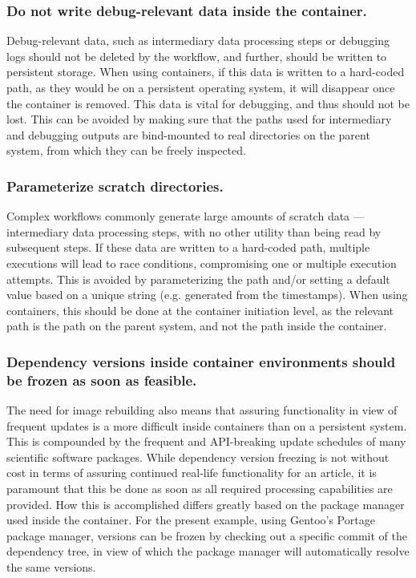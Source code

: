 \subsubsection{Do not write debug-relevant data inside the container.}
Debug-relevant data, such as intermediary data processing steps or debugging logs should not be deleted by the workflow, and further, should be written to persistent storage.
When using containers, if this data is written to a hard-coded path, as they would be on a persistent operating system, it will disappear once the container is removed.
This data is vital for debugging, and thus should not be lost.
This can be avoided by making sure that the paths used for intermediary and debugging outputs are bind-mounted to real directories on the parent system, from which they can be freely inspected.

\subsubsection{Parameterize scratch directories.}
Complex workflows commonly generate large amounts of scratch data — intermediary data processing steps, with no other utility than being read by subsequent steps.
If these data are written to a hard-coded path, multiple executions will lead to race conditions, compromising one or multiple execution attempts.
This is avoided by parameterizing the path and/or setting a default value based on a unique string (e.g. generated from the timestamps).
When using containers, this should be done at the container initiation level, as the relevant path is the path on the parent system, and not the path inside the container.

\subsubsection{Dependency versions inside container environments should be frozen as soon as feasible.}
The need for image rebuilding also means that assuring functionality in view of frequent updates is a more difficult inside containers than on a persistent system.
This is compounded by the frequent and API-breaking update schedules of many scientific software packages.
While dependency version freezing is not without cost in terms of assuring continued real-life functionality for an article, it is paramount that this be done as soon as all required processing capabilities are provided.
How this is accomplished differs greatly based on the package manager used inside the container.
For the present example, using Gentoo's Portage package manager, versions can be frozen by checking out a specific commit of the dependency tree, in view of which the package manager will automatically resolve the same versions.


